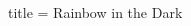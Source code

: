 \begin{song}{title = Rainbow in the Dark}
\begin{multicols}{2}
\end{multicols}

\end{song}

\begin{wrapfigure}{r}{0.1\textwidth}
\end{wrapfigure}
\chordG
\chordAm
\chordF
\chordE
